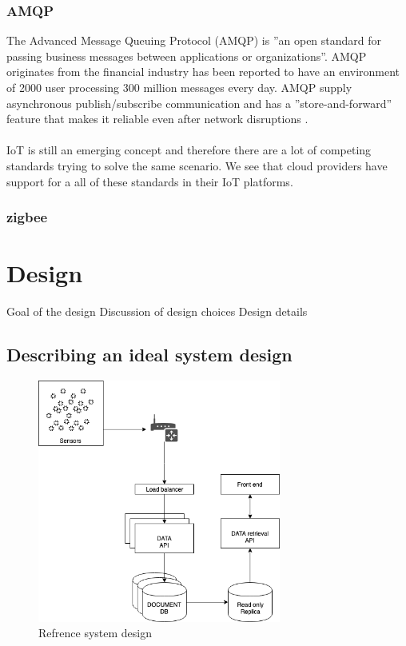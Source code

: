 \documentclass[]{uiophd}
\begin{document}
\subsection{AMQP}
The Advanced Message Queuing Protocol (AMQP) is ''an open standard for passing business messages between applications or organizations''\cite{amqp}. AMQP originates from the financial industry has been reported to have an environment of 2000 user processing 300 million messages every day. AMQP supply asynchronous publish/subscribe communication and has a ''store-and-forward'' feature that makes it reliable even after network disruptions \cite{karagiannis2015survey}. 
\\\\
IoT is still an emerging concept and therefore there are a lot of competing standards trying to solve the same scenario. We see that cloud providers have support for a all of these standards in their IoT platforms.

\subsection{zigbee}

\chapter{Design}

Goal of the design
Discussion of design choices
Design details

\section{Describing an ideal system design}
\begin{figure}[h]
\caption{Refrence system design}
\centering
\includegraphics[width=8cm]{ideal_system_design.png}

\end{figure}
\end{document}
